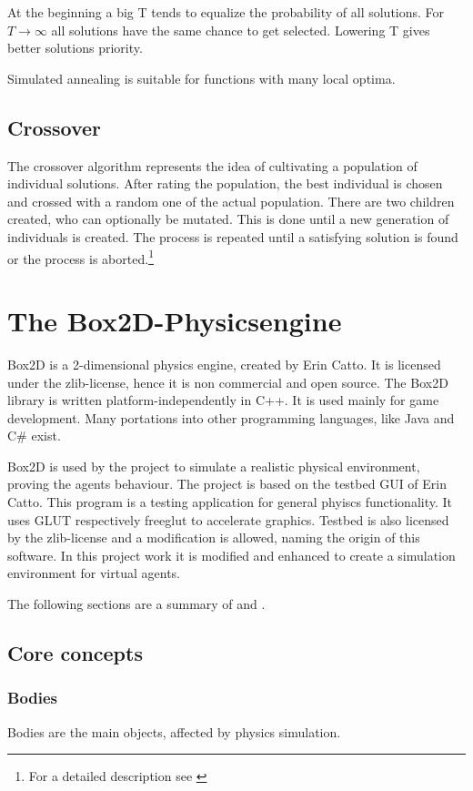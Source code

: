 \documentclass[10pt,a4paper,DIV=11]{scrreprt}
\begin{document}
At the beginning a big T tends to equalize the probability of all solutions. For $T \to \infty$ all solutions have the same chance to get selected. Lowering T gives better solutions priority.

Simulated annealing is suitable for functions with many local optima. \cite{evo}

\section{Crossover}
The crossover algorithm represents the idea of cultivating a population of individual solutions. After rating the population, the best individual is chosen and crossed with a random one of the actual population. There are two children created, who can optionally be mutated. This is done until a new generation of individuals is created.
The process is repeated until a satisfying solution is found or the process is aborted.\footnote{For a detailed description see \cite{Jona}}



\chapter{The Box2D-Physicsengine}
Box2D is a 2-dimensional physics engine, created by Erin Catto\cite{box}. It is licensed under the zlib-license, hence it is non commercial and open source. The Box2D library is written platform-independently in C++. It is used mainly for game development. Many portations into other programming languages, like Java and C\# exist.

Box2D is used by the project to simulate a realistic physical environment, proving the agents behaviour. The project is based on the testbed GUI of Erin Catto. This program is a testing application for general phyiscs functionality. It uses GLUT respectively freeglut to accelerate graphics. Testbed is also licensed by the zlib-license and a modification is allowed, naming the origin of this software. In this project work it is modified and enhanced to create a simulation environment for virtual agents.

The following sections are a summary of \cite{box} and \cite{iforce}.

\section{Core concepts}

\subsection{Bodies}
Bodies are the main objects, affected by physics simulation.
\end{document}
